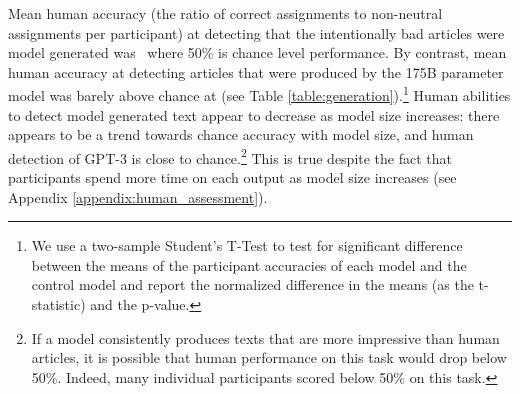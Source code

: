 \documentclass{article}
\begin{document}
Mean human accuracy (the ratio of correct assignments to non-neutral assignments per participant) at detecting that the intentionally bad articles were model generated was  \, where 50\% is chance level performance. By contrast, mean human accuracy at detecting articles that were produced by the 175B parameter model was barely above chance at  (see Table \ref{table:generation}).\footnote{We use a two-sample Student’s T-Test to test for significant difference between the means of the participant accuracies of each model and the control model and report the normalized difference in the means (as the t-statistic) and the p-value.} Human abilities to detect model generated text appear to decrease as model size increases: there appears to be a trend towards chance accuracy with model size, and human detection of GPT-3 is close to chance.\footnote{If a model consistently produces texts that are more impressive than human articles, it is possible that human performance on this task would drop below 50\%. Indeed, many individual participants scored below 50\% on this task.} This is true despite the fact that participants spend more time on each output as model size increases (see Appendix \ref{appendix:human_assessment}).
\end{document}
